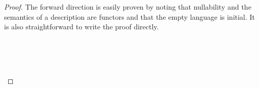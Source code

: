 \begin{proof}
The forward direction is easily proven by noting that nullability and the
semantics of a description are functors and that the empty language is initial.
It is also straightforward to write the proof directly.
\begin{code}%
%
\>[4]\AgdaSpace{}%
\AgdaSymbol{:}\AgdaSpace{}%
\AgdaSpace{}%
\AgdaSpace{}%
\AgdaSpace{}%
\AgdaSpace{}%
\AgdaSymbol{(}\AgdaSpace{}%
\AgdaSpace{}%
\AgdaSpace{}%
\AgdaSymbol{)}\AgdaSpace{}%
\AgdaSpace{}%
\AgdaSpace{}%
\AgdaSymbol{(}\AgdaSpace{}%
\AgdaSpace{}%
\AgdaSpace{}%
\AgdaSpace{}%
\AgdaSpace{}%
\AgdaSymbol{)}\<%
\end{code}
\begin{code}[hide]%
%
\>[4]\AgdaSpace{}%
\AgdaSpace{}%
\AgdaSymbol{\AgdaUnderscore{}}\AgdaSpace{}%
\AgdaSymbol{=}\AgdaSpace{}%
\<%
\\
%
\>[4]\AgdaSpace{}%
\AgdaSymbol{(}\AgdaSpace{}%
\AgdaSpace{}%
\AgdaSymbol{)}\AgdaSpace{}%
\AgdaSymbol{(}\AgdaSpace{}%
\AgdaSymbol{)}\AgdaSpace{}%
\AgdaSymbol{=}\AgdaSpace{}%
\AgdaSpace{}%
\AgdaSymbol{(}\AgdaSpace{}%
\AgdaSpace{}%
\AgdaSymbol{)}\<%
\\
%
\>[4]\AgdaSpace{}%
\AgdaSymbol{(}\AgdaSpace{}%
\AgdaSpace{}%
\AgdaSymbol{)}\AgdaSpace{}%
\AgdaSymbol{(}\AgdaSpace{}%
\AgdaSymbol{)}\AgdaSpace{}%
\AgdaSymbol{=}\AgdaSpace{}%
\AgdaSpace{}%
\AgdaSymbol{(}\AgdaSpace{}%
\AgdaSpace{}%
\AgdaSymbol{)}\<%
\\
%
\>[4]\AgdaSpace{}%
\AgdaSymbol{(}\AgdaSpace{}%
\AgdaSpace{}%
\AgdaSymbol{)}\AgdaSpace{}%
\AgdaSymbol{(}\AgdaInductiveConstructor{[]}\AgdaSpace{}%
\AgdaOperator{\AgdaInductiveConstructor{,}}\AgdaSpace{}%

\end{code}
\end{proof}
